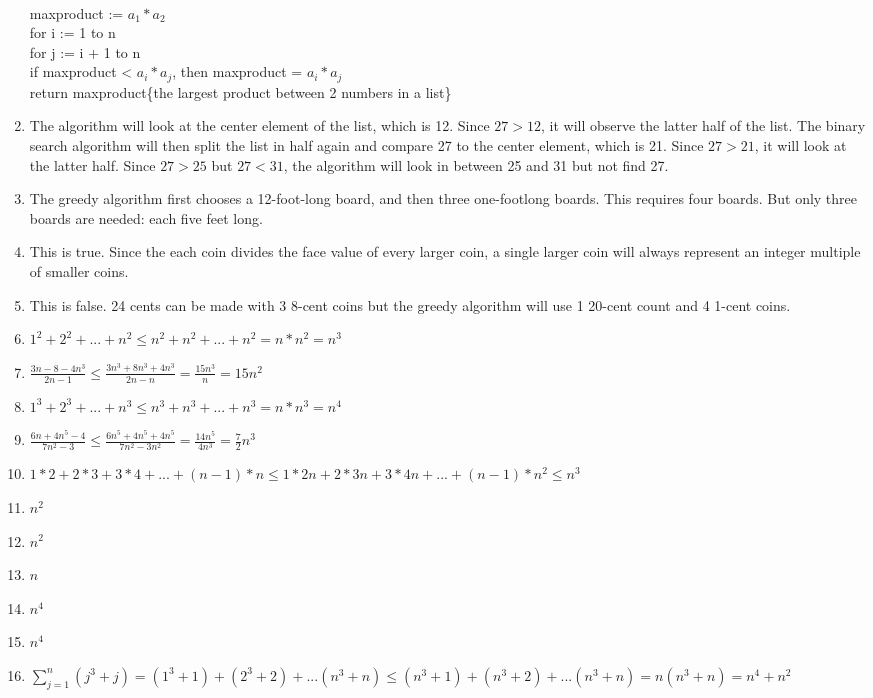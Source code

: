 \documentclass[11pt]{article}
\begin{document}
\begin{enumerate}
	\\maxproduct := $a_1 * a_2$
	\\for i := 1 to n
	\\\hspace*{20pt}for j := i + 1 to n
	\\\hspace*{20pt}if maxproduct < $a_i * a_j$, then maxproduct = $a_i * a_j$
	\\return maxproduct\{the largest product between 2 numbers in a list\}
\item The algorithm will look at the center element of the list, which is 12. Since $27 > 12$, it will observe the latter half of the list. The binary search algorithm will then split the list in half again and compare 27 to the center element, which is 21. Since $27 > 21$, it will look at the latter half. Since $27 > 25$ but $27 < 31$, the algorithm will look in between 25 and 31 but not find 27.
\item The greedy algorithm first chooses a 12-foot-long board, and then three one-footlong
boards. This requires four boards. But only three boards are needed: each five
feet long.
\item This is true. Since the each coin divides the face value of every larger coin, a single larger coin will always represent an integer multiple of smaller coins.
\item This is false. 24 cents can be made with 3 8-cent coins but the greedy algorithm will use 1 20-cent count and 4 1-cent coins.
\item $1^2 + 2^2 +...+n^2 \leq n^2 + n^2 + ... + n^2 = n * n^2 = n^3$
\item $\frac{3n-8-4n^3}{2n-1} \leq \frac{3n^3+8n^3+4n^3}{2n-n}=\frac{15n^3}{n}=15n^2$
\item $1^3 + 2^3 +...+n^3 \leq n^3 + n^3 + ... + n^3 = n * n^3 = n^4$
\item $\frac{6n + 4n^5 - 4}{7n^2 - 3} \leq \frac{6n^5 + 4n^5 + 4n^5}{7n^2-3n^2} = \frac{14n^5}{4n^3} = \frac{7}{2}n^3$
\item $1 * 2 + 2 * 3 + 3 * 4 + ... + (n-1) * n \leq 1 * 2n + 2 * 3n + 3 * 4n +...+(n-1)*n^2 \leq n^3$ 
\item $n^2$
\item $n^2$
\item $n$
\item $n^4$
\item $n^4$
\item $\sum\limits_{j=1}^n (j^3 + j) = (1^3 + 1) + (2^3 + 2) + ... (n^3 + n) \leq (n^3 + 1) + (n^3 + 2) + ... (n^3 + n)= n(n^3 + n) = n^4 + n^2$

\end{enumerate}
\end{document}
